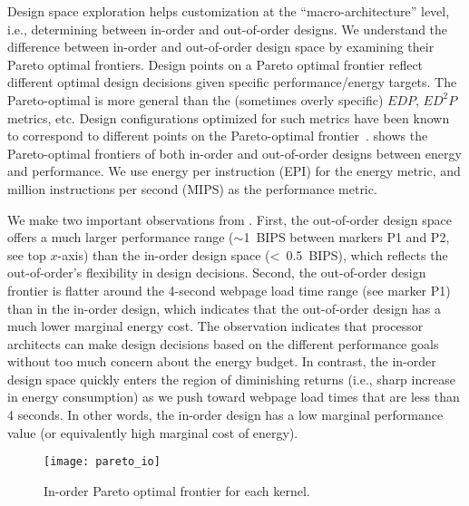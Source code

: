 Design space exploration helps customization at the ``macro-architecture'' level, i.e., determining between in-order and out-of-order designs. We understand the difference between in-order and out-of-order design space by examining their Pareto optimal frontiers. Design points on a Pareto optimal frontier reflect different optimal design decisions given specific performance/energy targets. The Pareto-optimal is more general than the (sometimes overly specific) $EDP$, $ED^{2}P$ metrics, etc. Design configurations optimized for such metrics have been known to correspond to different points on the Pareto-optimal frontier~\cite{marginal}.  shows the Pareto-optimal frontiers of both in-order and out-of-order designs between energy and performance. We use energy per instruction (EPI) for the energy metric, and million instructions per second (MIPS) as the performance metric. 

We make two important observations from . First, the out-of-order design space offers a much larger performance range ($\sim$1~BIPS between markers P1 and P2, see top $x$-axis) than the in-order design space (\textless~0.5~BIPS), which reflects the out-of-order's flexibility in design decisions. Second, the out-of-order design frontier is flatter around the 4-second webpage load time range (see marker P1) than in the in-order design, which indicates that the out-of-order design has a much lower marginal energy cost. The observation indicates that processor architects can make design decisions based on the different performance goals without too much concern about the energy budget. In contrast, the in-order design space quickly enters the region of diminishing returns (i.e., sharp increase in energy consumption) as we push toward webpage load times that are less than 4 seconds. In other words, the in-order design has a low marginal performance value (or equivalently high marginal cost of energy).


\begin{figure}[t]
  \centering
  \texttt{[image: pareto\_io]}
  \caption{In-order Pareto optimal frontier for each kernel.}
  \label{fig:pareto_io}
\end{figure}

